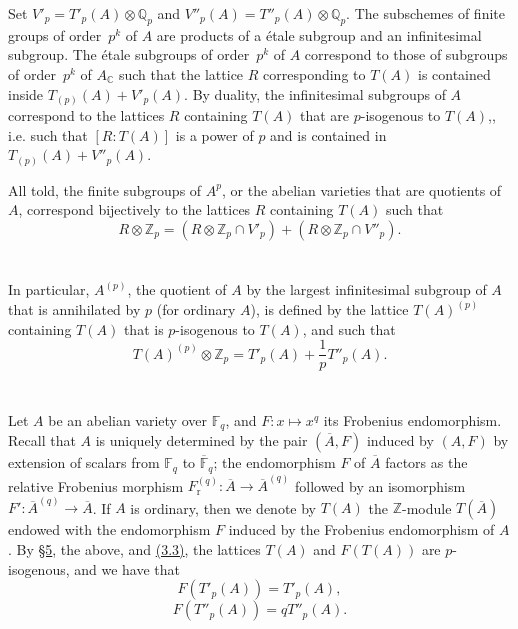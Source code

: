 \documentclass{article}
\newcommand{\FF}{\mathbb{F}}
\newcommand{\ZZ}{\mathbb{Z}}
\newcommand{\QQ}{\mathbb{Q}}
\newcommand{\CC}{\mathbb{C}}
\newcommand{\Fr}{F_\mathrm{r}}
\begin{document}
Set $V'_p=T'_p(A)\otimes\QQ_p$ and $V''_p(A)=T''_p(A)\otimes\QQ_p$.
The subschemes of finite groups of order~$p^k$ of $A$ are products of a \'{e}tale subgroup and an infinitesimal subgroup.
The \'{e}tale subgroups of order~$p^k$ of $A$ correspond to those of subgroups of order~$p^k$ of $A_\CC$ such that the lattice $R$ corresponding to $T(A)$ is contained inside $T_{(p)}(A)+V'_p(A)$.
By duality, the infinitesimal subgroups of $A$ correspond to the lattices $R$ containing $T(A)$ that are $p$-isogenous to $T(A)$,, i.e. such that $[R:T(A)]$ is a power of $p$ and is contained in $T_{(p)}(A)+V''_p(A)$.

All told, the finite subgroups of $A^p$, or the abelian varieties that are quotients of $A$, correspond bijectively to the lattices $R$ containing $T(A)$ such that
\[
\label{4.1}
  R\otimes\ZZ_p = (R\otimes\ZZ_p \cap V'_p) + (R\otimes\ZZ_p \cap V''_p).
\tag{4.1}
\]


\section{}
\label{5}
In particular, $A^{(p)}$, the quotient of $A$ by the largest infinitesimal subgroup of $A$ that is annihilated by $p$ (for ordinary $A$), is defined by the lattice $T(A)^{(p)}$ containing $T(A)$ that is $p$-isogenous to $T(A)$, and such that
\[
  T(A)^{(p)}\otimes\ZZ_p = T'_p(A) + \frac1p T''_p(A).
\]


\section{}
\label{6}
Let $A$ be an abelian variety over $\FF_q$, and $F\colon x\mapsto x^q$ its Frobenius endomorphism.
Recall that $A$ is uniquely determined by the pair $(\overline{A},F)$ induced by $(A,F)$ by extension of scalars from $\FF_q$ to $\overline{\FF}_q$;
the endomorphism $F$ of $\overline{A}$ factors as the relative Frobenius morphism $\Fr^{(q)}\colon\overline{A}\to\overline{A}^{(q)}$ followed by an isomorphism $F'\colon\overline{A}^{(q)}\to\overline{A}$.
If $A$ is ordinary, then we denote by $T(A)$ the $\ZZ$-module $T(\overline{A})$ endowed with the endomorphism $F$ induced by the Frobenius endomorphism of $A$.
By \hyperref[5]{\S5}, the above, and \hyperref[3.3]{(3.3)}, the lattices $T(A)$ and $F(T(A))$ are $p$-isogenous, and we have that
\[
\label{6.1}
  F(T'_p(A)) = T'_p(A),
\tag{6.1}
\]
\[
\label{6.2}
  F(T''_p(A)) = qT''_p(A).
\tag{6.2}
\]
\end{document}
